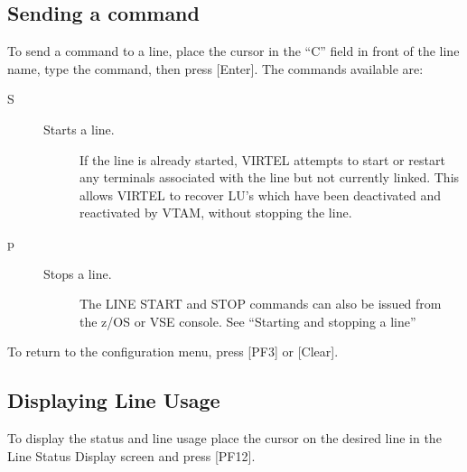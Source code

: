 \documentclass[letterpaper,10pt,english]{sphinxmanual}
\begin{document}
\ignorespaces 

\subsection{Sending a command}
\label{\detokenize{audit_operations_ and_performance:sending-a-command}}\label{\detokenize{audit_operations_ and_performance:index-37}}
To send a command to a line, place the cursor in the “C” field in front of the line name, type the command, then press {[}Enter{]}. The  commands available are:
\begin{description}
\item[{S}] \leavevmode\begin{description}
\item[{Starts a line.}] \leavevmode
If the line is already started, VIRTEL attempts to start or restart any terminals associated with the line but not currently linked. This allows VIRTEL to recover LU’s which have been     deactivated and reactivated by VTAM, without stopping the line.

\end{description}

\item[{p}] \leavevmode\begin{description}
\item[{Stops a line.}] \leavevmode
The LINE START and STOP commands can also be issued from the z/OS or VSE console. See “Starting and stopping a line”

\end{description}

\end{description}

To return to the configuration menu, press {[}PF3{]} or {[}Clear{]}.

\ignorespaces 

\subsection{Displaying Line Usage}
\label{\detokenize{audit_operations_ and_performance:displaying-line-usage}}\label{\detokenize{audit_operations_ and_performance:index-38}}
To display the status and line usage place the cursor on the desired line in the Line Status Display screen and press {[}PF12{]}.
\end{document}
